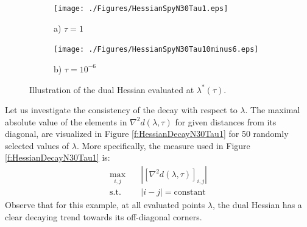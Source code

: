 \begin{figure}[h]
\centering
\begin{subfigure}{.5\linewidth}
  \centering
  \texttt{[image: ./Figures/HessianSpyN30Tau1.eps]}
  \caption{a) $\tau = 1$}
  \label{f:HessianSpyN30Tau1}
\end{subfigure}%
\begin{subfigure}{.5\linewidth}
  \centering
  \texttt{[image: ./Figures/HessianSpyN30Tau10minus6.eps]}
  \caption{b) $\tau = 10^{-6}$}
  \label{f:HessianSpyN30Tau10minus6}
\end{subfigure}
\caption{Illustration of the dual Hessian evaluated at $\lambda^*(\tau)$.}
\label{fig:test}
\end{figure}

Let us investigate the consistency of the decay with respect to $\lambda$. The maximal absolute value of the elements in $\nabla^2 d(\lambda, \tau)$ for given distances from its diagonal, are visualized in Figure \ref{f:HessianDecayN30Tau1} for 50 randomly selected values of $\lambda$. More specifically, the measure used in Figure \ref{f:HessianDecayN30Tau1} is:
\begin{equation}
\begin{aligned}
\max_{i,j} & \quad | [\nabla^2 d(\lambda,\tau)]_{i,j} | \\
\text{s.t.} & \quad |i - j| = \text{constant}
\end{aligned}
\end{equation}
Observe that for this example, at all evaluated points $\lambda$, the dual Hessian has a clear decaying trend towards its off-diagonal corners.

